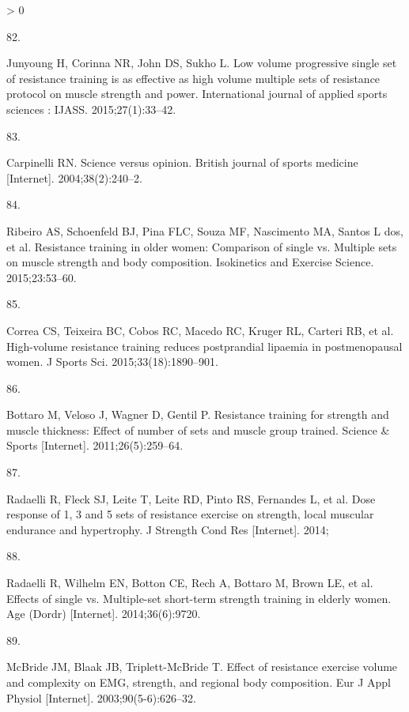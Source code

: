 \documentclass[twoside,10pt]{gihclass} %
\newlength{\cslhangindent}
\newlength{\csllabelwidth}
\newenvironment{CSLReferences}[3] %
 {%
  \setlength{\parindent}{0pt}
  \ifodd #1 \everypar{\setlength{\hangindent}{\cslhangindent}}\ignorespaces\fi
  \ifnum #2 > 0
  \setlength{\parskip}{#2\baselineskip}
  \fi
 }%
 {}
\newcommand{\CSLLeftMargin}[1]{\parbox[t]{\maxof{\widthof{#1}}{\csllabelwidth}}{#1}}
\newcommand{\CSLRightInline}[1]{\parbox[t]{\linewidth}{#1}}
\begin{document}
\begin{CSLReferences}{0}{0}
\leavevmode\hypertarget{ref-RN2568}{}%
\CSLLeftMargin{82. }
\CSLRightInline{Junyoung H, Corinna NR, John DS, Sukho L. Low volume progressive single set of resistance training is as effective as high volume multiple sets of resistance protocol on muscle strength and power. International journal of applied sports sciences : IJASS. 2015;27(1):33--42. }

\leavevmode\hypertarget{ref-RN2201}{}%
\CSLLeftMargin{83. }
\CSLRightInline{Carpinelli RN. Science versus opinion. British journal of sports medicine {[}Internet{]}. 2004;38(2):240--2. }

\leavevmode\hypertarget{ref-RN2465}{}%
\CSLLeftMargin{84. }
\CSLRightInline{Ribeiro AS, Schoenfeld BJ, Pina FLC, Souza MF, Nascimento MA, Santos L dos, et al. Resistance training in older women: Comparison of single vs. Multiple sets on muscle strength and body composition. Isokinetics and Exercise Science. 2015;23:53--60. }

\leavevmode\hypertarget{ref-RN2464}{}%
\CSLLeftMargin{85. }
\CSLRightInline{Correa CS, Teixeira BC, Cobos RC, Macedo RC, Kruger RL, Carteri RB, et al. High-volume resistance training reduces postprandial lipaemia in postmenopausal women. J Sports Sci. 2015;33(18):1890--901. }

\leavevmode\hypertarget{ref-RN2463}{}%
\CSLLeftMargin{86. }
\CSLRightInline{Bottaro M, Veloso J, Wagner D, Gentil P. Resistance training for strength and muscle thickness: Effect of number of sets and muscle group trained. Science \& Sports {[}Internet{]}. 2011;26(5):259--64. }

\leavevmode\hypertarget{ref-RN1570}{}%
\CSLLeftMargin{87. }
\CSLRightInline{Radaelli R, Fleck SJ, Leite T, Leite RD, Pinto RS, Fernandes L, et al. Dose response of 1, 3 and 5 sets of resistance exercise on strength, local muscular endurance and hypertrophy. J Strength Cond Res {[}Internet{]}. 2014; }

\leavevmode\hypertarget{ref-RN1518}{}%
\CSLLeftMargin{88. }
\CSLRightInline{Radaelli R, Wilhelm EN, Botton CE, Rech A, Bottaro M, Brown LE, et al. Effects of single vs. Multiple-set short-term strength training in elderly women. Age (Dordr) {[}Internet{]}. 2014;36(6):9720. }

\leavevmode\hypertarget{ref-RN1474}{}%
\CSLLeftMargin{89. }
\CSLRightInline{McBride JM, Blaak JB, Triplett-McBride T. Effect of resistance exercise volume and complexity on EMG, strength, and regional body composition. Eur J Appl Physiol {[}Internet{]}. 2003;90(5-6):626--32. }


\end{CSLReferences}
\end{document}
